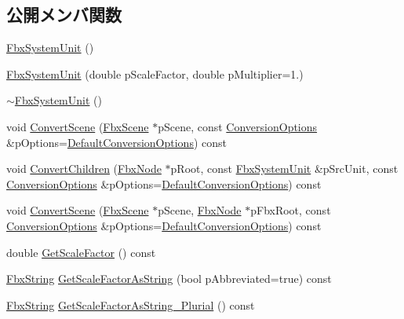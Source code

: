\subsection*{公開メンバ関数}
\begin{DoxyCompactItemize}
\item 
\hyperlink{class_fbx_system_unit_aec08a323b4e20c8c13fed7771370cace}{Fbx\+System\+Unit} ()
\item 
\hyperlink{class_fbx_system_unit_a6b265b9eccd00fbc09bb8064c9f3f7c4}{Fbx\+System\+Unit} (double p\+Scale\+Factor, double p\+Multiplier=1.)
\item 
\hyperlink{class_fbx_system_unit_a151549b75cf9aadef6c943adb814122f}{$\sim$\+Fbx\+System\+Unit} ()
\item 
void \hyperlink{class_fbx_system_unit_ad31fce9160b21a9ba8069efd1878b2a1}{Convert\+Scene} (\hyperlink{class_fbx_scene}{Fbx\+Scene} $\ast$p\+Scene, const \hyperlink{struct_fbx_system_unit_1_1_conversion_options}{Conversion\+Options} \&p\+Options=\hyperlink{class_fbx_system_unit_ae76376923416767b2a5f6a7e4e663064}{Default\+Conversion\+Options}) const
\item 
void \hyperlink{class_fbx_system_unit_af40efc8ae0ce1fb6911e1d30baa96758}{Convert\+Children} (\hyperlink{class_fbx_node}{Fbx\+Node} $\ast$p\+Root, const \hyperlink{class_fbx_system_unit}{Fbx\+System\+Unit} \&p\+Src\+Unit, const \hyperlink{struct_fbx_system_unit_1_1_conversion_options}{Conversion\+Options} \&p\+Options=\hyperlink{class_fbx_system_unit_ae76376923416767b2a5f6a7e4e663064}{Default\+Conversion\+Options}) const
\item 
void \hyperlink{class_fbx_system_unit_a29b302d74518106bdc5e2d21ee687e09}{Convert\+Scene} (\hyperlink{class_fbx_scene}{Fbx\+Scene} $\ast$p\+Scene, \hyperlink{class_fbx_node}{Fbx\+Node} $\ast$p\+Fbx\+Root, const \hyperlink{struct_fbx_system_unit_1_1_conversion_options}{Conversion\+Options} \&p\+Options=\hyperlink{class_fbx_system_unit_ae76376923416767b2a5f6a7e4e663064}{Default\+Conversion\+Options}) const
\item 
double \hyperlink{class_fbx_system_unit_a9421294bb5936de827e0a9b8472f6095}{Get\+Scale\+Factor} () const
\item 
\hyperlink{class_fbx_string}{Fbx\+String} \hyperlink{class_fbx_system_unit_a8c8481b9936bc2fa9320b29c7a1a4ff5}{Get\+Scale\+Factor\+As\+String} (bool p\+Abbreviated=true) const
\item 
\hyperlink{class_fbx_string}{Fbx\+String} \hyperlink{class_fbx_system_unit_aa9a883aeffb6e9814b3ecc6157606954}{Get\+Scale\+Factor\+As\+String\+\_\+\+Plurial} () const

\end{DoxyCompactItemize}
